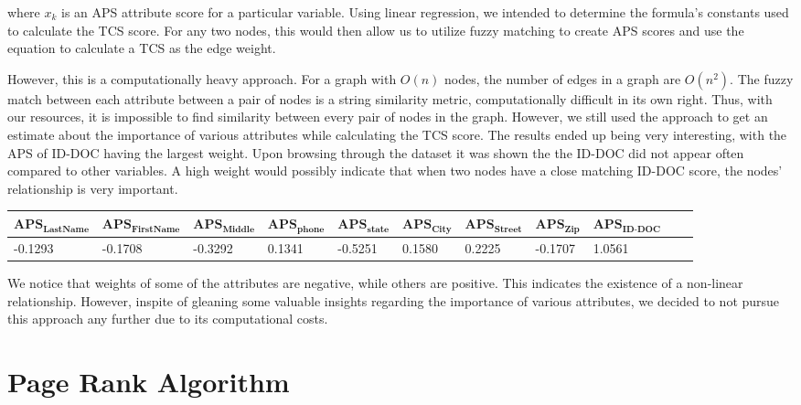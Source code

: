 \documentclass{article} %
\begin{document}
where $x_k$ is an APS attribute score for a particular variable. Using linear regression, we intended to determine the formula's constants used to calculate the TCS score. For any two nodes, this would then allow us to utilize fuzzy matching to create APS scores and use the equation to calculate a TCS as the edge weight.

However, this is a computationally heavy approach. For a graph with $O(n)$ nodes, the number of edges in a graph are $O(n^2)$. The fuzzy match between each attribute between a pair of nodes is a string similarity metric, computationally difficult in its own right. Thus, with our resources, it is impossible to find similarity between every pair of nodes in the graph. However, we still used the approach to get an estimate about the importance of various attributes while calculating the TCS score. The results ended up being very interesting, with the APS of ID-DOC having the largest weight. Upon browsing through the dataset it was shown the the ID-DOC did not appear often compared to other variables. A high weight would possibly indicate that when two nodes have a close matching ID-DOC score, the nodes' relationship is very important. 
\begin{table}[h]
\centering
\tiny
\begin{tabular}{|l|l|l|l|l|l|l|l|l|l|l|}
\hline
 $\textbf{APS}_{\textbf{LastName}}$ & $\textbf{APS}_{\textbf{FirstName}}$ &  $\textbf{APS}_{\textbf{Middle}}$ &$\textbf{APS}_{\textbf{phone}}$ & $\textbf{APS}_{\textbf{state}}$ & $\textbf{APS}_{\textbf{City}}$ & $\textbf{APS}_{\textbf{Street}}$ & $\textbf{APS}_{\textbf{Zip}}$ & $\textbf{APS}_{\textbf{ID-DOC}}$   \\ \hline

-0.1293 & -0.1708 &  -0.3292 &0.1341 & -0.5251 & 0.1580 &  0.2225 & -0.1707 & 1.0561  \\ \hline
\end{tabular}
\end{table}

We notice that weights of some of the attributes are negative, while others are positive. This indicates the existence of a non-linear relationship. However, inspite of gleaning some valuable insights regarding the importance of various attributes, we decided to not pursue this approach any further due to its computational costs.


\section{Page Rank Algorithm}
\end{document}
